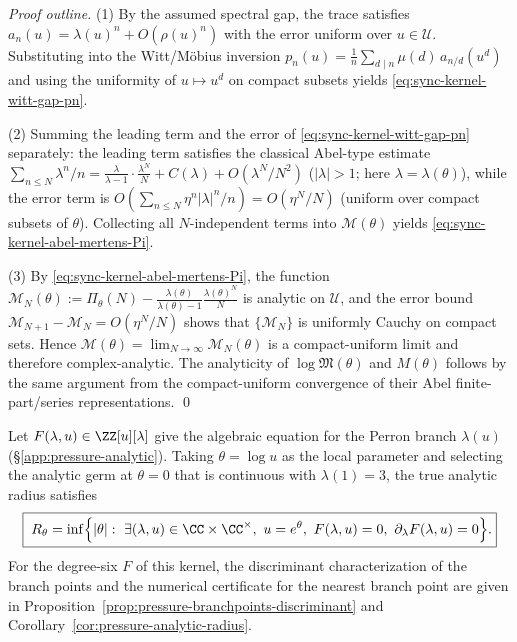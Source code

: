 \begin{proof}[Proof outline]
(1) By the assumed spectral gap, the trace satisfies
\(
a_n(u)=\lambda(u)^n+O(\rho(u)^n)
\)
with the error uniform over \(u\in\mathcal U\).
Substituting into the Witt/M\"obius inversion
\(
p_n(u)=\frac{1}{n}\sum_{d\mid n}\mu(d)\,a_{n/d}(u^d)
\)
and using the uniformity of \(u\mapsto u^d\) on compact subsets yields \eqref{eq:sync-kernel-witt-gap-pn}.
\par
(2) Summing the leading term and the error of \eqref{eq:sync-kernel-witt-gap-pn} separately: the leading term satisfies the classical Abel-type estimate
\(
\sum_{n\le N}\lambda^n/n
=
\frac{\lambda}{\lambda-1}\cdot\frac{\lambda^N}{N}+C(\lambda)+O(\lambda^N/N^2)
\)
(\(|\lambda|>1\); here \(\lambda=\lambda(\theta)\)), while the error term is
\(
O(\sum_{n\le N}\eta^n|\lambda|^n/n)=O(\eta^N/N)
\)
(uniform over compact subsets of \(\theta\)).
Collecting all \(N\)-independent terms into \(\mathcal M(\theta)\) yields \eqref{eq:sync-kernel-abel-mertens-Pi}.
\par
(3) By \eqref{eq:sync-kernel-abel-mertens-Pi}, the function
\(
\mathcal M_N(\theta):=\Pi_\theta(N)-\frac{\lambda(\theta)}{\lambda(\theta)-1}\frac{\lambda(\theta)^N}{N}
\)
is analytic on \(\mathcal U\), and the error bound \(\mathcal M_{N+1}-\mathcal M_N=O(\eta^N/N)\) shows that
\(\{\mathcal M_N\}\) is uniformly Cauchy on compact sets.
Hence \(\mathcal M(\theta)=\lim_{N\to\infty}\mathcal M_N(\theta)\) is a compact-uniform limit and therefore complex-analytic.
The analyticity of \(\log\mathfrak{M}(\theta)\) and \(M(\theta)\) follows by the same argument from the compact-uniform convergence of their Abel finite-part/series representations. \qed
\end{proof}

\begin{corollary}\label{cor:sync-kernel-analytic-radius-discriminant-formula}
Let \(F(\lambda,u)\in\ZZ[u][\lambda]\) give the algebraic equation for the Perron branch \(\lambda(u)\) (\S\ref{app:pressure-analytic}).
Taking \(\theta=\log u\) as the local parameter and selecting the analytic germ at \(\theta=0\) that is continuous with \(\lambda(1)=3\), the true analytic radius satisfies
\[
\boxed{\;
R_\theta=\inf\Bigl\{|\theta|:\ \exists(\lambda,u)\in\CC\times\CC^\times,\ u=e^\theta,\ F(\lambda,u)=0,\ \partial_\lambda F(\lambda,u)=0\Bigr\}.}
\]
For the degree-six \(F\) of this kernel, the discriminant characterization of the branch points and the numerical certificate for the nearest branch point are given in Proposition~\ref{prop:pressure-branchpoints-discriminant} and Corollary~\ref{cor:pressure-analytic-radius}.
\end{corollary}

